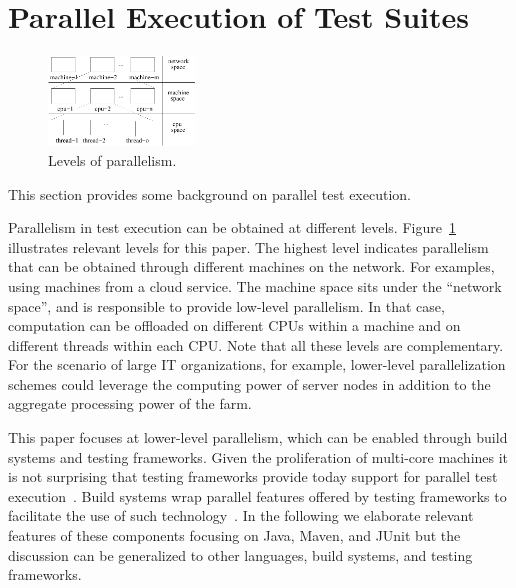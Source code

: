 \section{Parallel Execution of Test Suites}
\label{sec:modes}

\begin{figure}[t!]
  \centering
  \includegraphics[width=0.35\textwidth]{figs/parallel-levels.pdf}
  \vspace{-1ex}
  \caption{\label{fig:levels}Levels of parallelism.}
\end{figure}


This section provides some background on parallel test execution.

Parallelism in test execution can be obtained at different levels.
Figure~\ref{fig:levels} illustrates relevant levels for this paper.
The highest level indicates parallelism that can be obtained through
different machines on the network.  For examples, using machines from
a cloud service.  The machine space sits under the ``network space'',
and is responsible to provide low-level parallelism.  In that case,
computation can be offloaded on different CPUs within a machine and on
different threads within each CPU.  Note that all these levels are
complementary.  For the scenario of large IT organizations, for
example, lower-level parallelization schemes could leverage the
computing power of server nodes in addition to the aggregate
processing power of the farm.


This paper focuses at lower-level parallelism, which can be enabled
through build systems and testing frameworks.  Given the proliferation
of multi-core machines it is not surprising that testing frameworks
provide today support for parallel test
execution~\cite{junit-org,testng,nunit}.  Build systems wrap parallel
features offered by testing frameworks to facilitate the use of such
technology~\cite{maven-surefire-plugin}.  In the following we elaborate
relevant features of these components focusing on Java, Maven, and
JUnit but the discussion can be generalized to other languages, build
systems, and testing frameworks.


